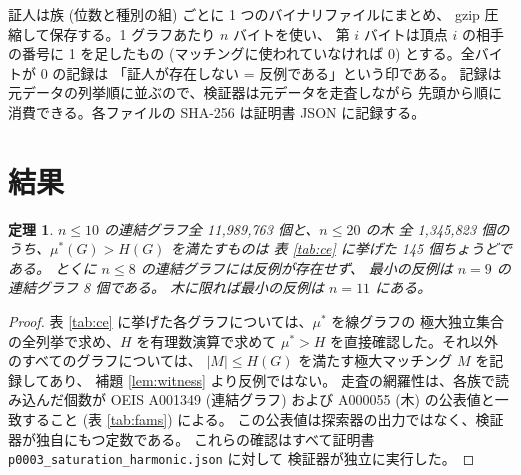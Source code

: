 \documentclass[paper=a4,fontsize=10.5pt,jafontsize=10.5pt]{jlreq}
\theoremstyle{plain}
\newtheorem{theorem}{定理}[section]
\theoremstyle{definition}
\begin{document}
証人は族 (位数と種別の組) ごとに 1 つのバイナリファイルにまとめ、
gzip 圧縮して保存する。1 グラフあたり $n$ バイトを使い、
第 $i$ バイトは頂点 $i$ の相手の番号に 1 を足したもの
(マッチングに使われていなければ 0) とする。全バイトが 0 の記録は
「証人が存在しない = 反例である」という印である。
記録は元データの列挙順に並ぶので、検証器は元データを走査しながら
先頭から順に消費できる。各ファイルの SHA-256 は証明書 JSON に記録する。

\section{結果}

\begin{theorem}\label{thm:main}
$n \le 10$ の連結グラフ全 11,989,763 個と、$n \le 20$ の木
全 1,345,823 個のうち、$\mu^*(G) > H(G)$ を満たすものは
表 \ref{tab:ce} に挙げた 145 個ちょうどである。
とくに $n \le 8$ の連結グラフには反例が存在せず、
最小の反例は $n = 9$ の連結グラフ 8 個である。
木に限れば最小の反例は $n = 11$ にある。
\end{theorem}

\begin{proof}
表 \ref{tab:ce} に挙げた各グラフについては、$\mu^*$ を線グラフの
極大独立集合の全列挙で求め、$H$ を有理数演算で求めて
$\mu^* > H$ を直接確認した。それ以外のすべてのグラフについては、
$|M| \le H(G)$ を満たす極大マッチング $M$ を記録してあり、
補題 \ref{lem:witness} より反例ではない。
走査の網羅性は、各族で読み込んだ個数が OEIS A001349 (連結グラフ) および
A000055 (木) の公表値と一致すること (表 \ref{tab:fams}) による。
この公表値は探索器の出力ではなく、検証器が独自にもつ定数である。
これらの確認はすべて証明書 \texttt{p0003\_saturation\_harmonic.json} に対して
検証器が独立に実行した。
\end{proof}
\end{document}
